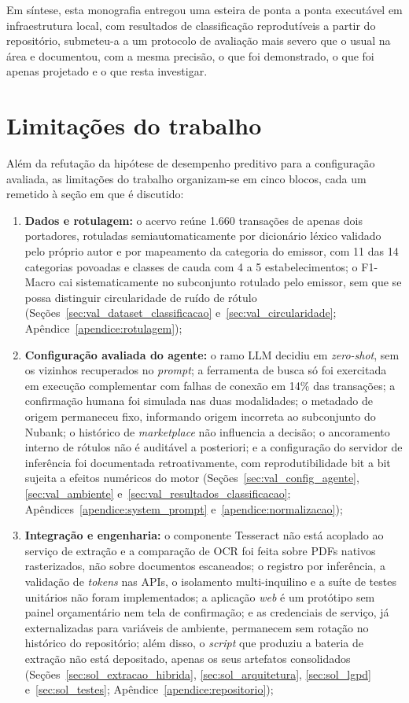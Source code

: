 Em síntese, esta monografia entregou uma esteira de ponta a ponta executável em infraestrutura local, com resultados de classificação reprodutíveis a partir do repositório, submeteu-a a um protocolo de avaliação mais severo que o usual na área e documentou, com a mesma precisão, o que foi demonstrado, o que foi apenas projetado e o que resta investigar.

\section{Limitações do trabalho}
\label{sec:concl_limitacoes}

Além da refutação da hipótese de desempenho preditivo para a configuração avaliada, as limitações do trabalho organizam-se em cinco blocos, cada um remetido à seção em que é discutido:
\begin{enumerate}
	\item \textbf{Dados e rotulagem:} o acervo reúne 1.660 transações de apenas dois portadores, rotuladas semiautomaticamente por dicionário léxico validado pelo próprio autor e por mapeamento da categoria do emissor, com 11 das 14 categorias povoadas e classes de cauda com 4 a 5 estabelecimentos; o F1-Macro cai sistematicamente no subconjunto rotulado pelo emissor, sem que se possa distinguir circularidade de ruído de rótulo (Seções~\ref{sec:val_dataset_classificacao} e~\ref{sec:val_circularidade}; Apêndice~\ref{apendice:rotulagem});
	\item \textbf{Configuração avaliada do agente:} o ramo LLM decidiu em \textit{zero-shot}, sem os vizinhos recuperados no \textit{prompt}; a ferramenta de busca só foi exercitada em execução complementar com falhas de conexão em 14\% das transações; a confirmação humana foi simulada nas duas modalidades; o metadado de origem permaneceu fixo, informando origem incorreta ao subconjunto do Nubank; o histórico de \textit{marketplace} não influencia a decisão; o ancoramento interno de rótulos não é auditável a posteriori; e a configuração do servidor de inferência foi documentada retroativamente, com reprodutibilidade bit a bit sujeita a efeitos numéricos do motor (Seções~\ref{sec:val_config_agente}, \ref{sec:val_ambiente} e~\ref{sec:val_resultados_classificacao}; Apêndices~\ref{apendice:system_prompt} e~\ref{apendice:normalizacao});
	\item \textbf{Integração e engenharia:} o componente Tesseract não está acoplado ao serviço de extração e a comparação de OCR foi feita sobre PDFs nativos rasterizados, não sobre documentos escaneados; o registro por inferência, a validação de \textit{tokens} nas APIs, o isolamento multi-inquilino e a suíte de testes unitários não foram implementados; a aplicação \textit{web} é um protótipo sem painel orçamentário nem tela de confirmação; e as credenciais de serviço, já externalizadas para variáveis de ambiente, permanecem sem rotação no histórico do repositório; além disso, o \textit{script} que produziu a bateria de extração não está depositado, apenas os seus artefatos consolidados (Seções~\ref{sec:sol_extracao_hibrida}, \ref{sec:sol_arquitetura}, \ref{sec:sol_lgpd} e~\ref{sec:sol_testes}; Apêndice~\ref{apendice:repositorio});

\end{enumerate}
